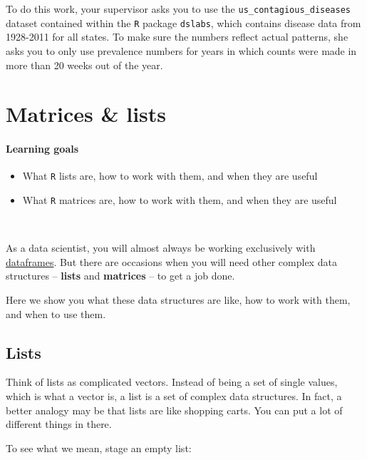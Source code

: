 \documentclass[]{book}
\providecommand{\tightlist}{%
  \setlength{\itemsep}{0pt}\setlength{\parskip}{0pt}}
\begin{document}
To do this work, your supervisor asks you to use the \texttt{us\_contagious\_diseases} dataset contained within the \texttt{R} package \texttt{dslabs}, which contains disease data from 1928-2011 for all states. To make sure the numbers reflect actual patterns, she asks you to only use prevalence numbers for years in which counts were made in more than 20 weeks out of the year.

\hypertarget{matrices-lists}{%
\chapter{Matrices \& lists}\label{matrices-lists}}

\hypertarget{learning-goals-34}{%
\subsubsection*{Learning goals}\label{learning-goals-34}}

\begin{itemize}
\tightlist
\item
  What \texttt{R} lists are, how to work with them, and when they are useful\\
\item
  What \texttt{R} matrices are, how to work with them, and when they are useful
\end{itemize}

~

As a data scientist, you will almost always be working exclusively with \protect\hyperlink{dataframes}{dataframes}. But there are occasions when you will need other complex data structures -- \textbf{lists} and \textbf{matrices} -- to get a job done.

Here we show you what these data structures are like, how to work with them, and when to use them.

\hypertarget{lists}{%
\section*{Lists}\label{lists}}

Think of lists as complicated vectors. Instead of being a set of single values, which is what a vector is, a list is a set of complex data structures. In fact, a better analogy may be that lists are like shopping carts. You can put a lot of different things in there.

To see what we mean, stage an empty list:
\end{document}
